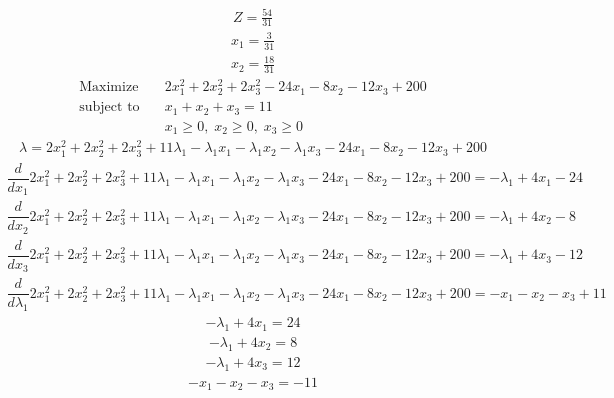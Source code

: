 \documentclass{article}
\begin{document}
\begin{align*}
Z=\frac{54}{31}\end{align*}
\begin{align*}
x_{1}=\frac{3}{31}\end{align*}
\begin{align*}
x_{2}=\frac{18}{31}\end{align*}
\begin{align*}
\text{Maximize} \quad & 2x_{1}^{2} + 2x_{2}^{2} + 2x_{3}^{2} - 24x_{1} - 8x_{2} - 12x_{3} + 200\\
\text{subject to} \quad
& x_{1} + x_{2} + x_{3}=11\\
& x_{1}\ge0,\; x_{2}\ge0,\; x_{3}\ge0\end{align*}
\begin{align*}
\lambda=2x_{1}^{2} + 2x_{2}^{2} + 2x_{3}^{2} + 11\lambda_{1} - \lambda_{1}x_{1} - \lambda_{1}x_{2} - \lambda_{1}x_{3} - 24x_{1} - 8x_{2} - 12x_{3} + 200\end{align*}
\begin{align*}
\dfrac{d}{dx_{1}}2x_{1}^{2} + 2x_{2}^{2} + 2x_{3}^{2} + 11\lambda_{1} - \lambda_{1}x_{1} - \lambda_{1}x_{2} - \lambda_{1}x_{3} - 24x_{1} - 8x_{2} - 12x_{3} + 200=-\lambda_{1} + 4x_{1} - 24\end{align*}
\begin{align*}
\dfrac{d}{dx_{2}}2x_{1}^{2} + 2x_{2}^{2} + 2x_{3}^{2} + 11\lambda_{1} - \lambda_{1}x_{1} - \lambda_{1}x_{2} - \lambda_{1}x_{3} - 24x_{1} - 8x_{2} - 12x_{3} + 200=-\lambda_{1} + 4x_{2} - 8\end{align*}
\begin{align*}
\dfrac{d}{dx_{3}}2x_{1}^{2} + 2x_{2}^{2} + 2x_{3}^{2} + 11\lambda_{1} - \lambda_{1}x_{1} - \lambda_{1}x_{2} - \lambda_{1}x_{3} - 24x_{1} - 8x_{2} - 12x_{3} + 200=-\lambda_{1} + 4x_{3} - 12\end{align*}
\begin{align*}
\dfrac{d}{d\lambda_{1}}2x_{1}^{2} + 2x_{2}^{2} + 2x_{3}^{2} + 11\lambda_{1} - \lambda_{1}x_{1} - \lambda_{1}x_{2} - \lambda_{1}x_{3} - 24x_{1} - 8x_{2} - 12x_{3} + 200=-x_{1} - x_{2} - x_{3} + 11\end{align*}
\begin{align*}
-\lambda_{1} + 4x_{1}=24\end{align*}
\begin{align*}
-\lambda_{1} + 4x_{2}=8\end{align*}
\begin{align*}
-\lambda_{1} + 4x_{3}=12\end{align*}
\begin{align*}
-x_{1} - x_{2} - x_{3}=-11\end{align*}
\end{document}
